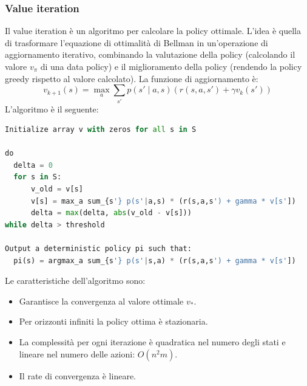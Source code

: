 \documentclass[a4paper]{article}
\begin{document}
\subsubsection{Value iteration}
Il value iteration è un algoritmo per calcolare la policy ottimale. L'idea è
quella di trasformare l'equazione di ottimalità di Bellman in un'operazione
di aggiornamento iterativo, combinando la valutazione della policy (calcolando
il valore \( v_{\pi } \) di una data policy) e il miglioramento della policy
(rendendo la policy greedy rispetto al valore calcolato).
La funzione di aggiornamento è:
\[
  v_{k+1}(s) = \max_{a} \sum_{s'} p(s' \;|\; a, s) \left( r(s, a, s') + \gamma v_k(s') \right)
\] 
L'algoritmo è il seguente:
\begin{lstlisting}[language=Python]
Initialize array v with zeros for all s in S

do
  delta = 0
  for s in S:
      v_old = v[s]
      v[s] = max_a sum_{s'} p(s'|a,s) * (r(s,a,s') + gamma * v[s'])
      delta = max(delta, abs(v_old - v[s]))
while delta > threshold

Output a deterministic policy pi such that:
  pi(s) = argmax_a sum_{s'} p(s'|s,a) * (r(s,a,s') + gamma * v[s'])
\end{lstlisting}
Le caratteristiche dell'algoritmo sono:
\begin{itemize}
  \item Garantisce la convergenza al valore ottimale \( v_* \).

  \item Per orizzonti infiniti la policy ottima è stazionaria.

  \item La complessità per ogni iterazione è quadratica nel numero degli stati
    e lineare nel numero delle azioni: \( O(n^2 m) \).

  \item Il rate di convergenza è lineare.
\end{itemize}
\end{document}
